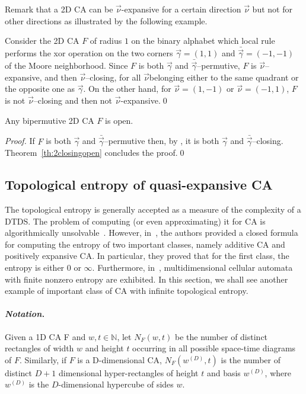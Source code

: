 \documentclass{llncs}
\newcommand{\n}{\ensuremath{\mathbb{N}}\xspace}
\newcommand{\zdu}{\ensuremath{\mathbb{Z}^2}\xspace}
\newcommand{\nn}{\vec\nu}
\newcommand{\gv}{\vec\gamma}
\renewcommand{\ll}{\vec \lambda}
\newcommand{\mm}{\vec \mu}
\newcommand{\ignore}[1]{}
\begin{document}
Remark that 
a 2D CA can be $\nn$-expansive for a certain direction $\nn$ but not
for other directions as illustrated by the following example.
\begin{example}\label{ex:1}
Consider the 2D CA $F$ of radius $1$ on the binary alphabet
which local rule performs the xor operation on the two corners
$\gv=(1,1)$ and $\bar{\gv}=(-1,-1)$ of the Moore neighborhood.
Since $F$ is both $\gv$ and $\bar{\gv}$--permutive, $F$ is
$\nn$--expansive, and then $\nn$--closing, for all $ \nn$belonging either to the same quadrant or the opposite one as $\gv$. 
On the other hand, for $\nn=(1,-1)$ or
$\nn=(-1,1)$, $F$ is not $\nn$--closing and then not
$\nn$-expansive.\qed
\end{example}
\begin{proposition}
Any bipermutive 2D CA $F$ is open.
\end{proposition}
\begin{proof}
If $F$ is both $\gv$ and $\bar{\gv}$--permutive then, 
by \cite[Prop. 5]{dennunzio08}, it is both $\gv$ and $\bar{\gv}$--closing.
Theorem~\ref{th:2closingopen} concludes the proof.\qed
\ignore{
Assume that $F$ is both $\gv$ and $\bar{\gv}$--permutive.
Let $\mm,\ll\in\zdu$ be such that $\gv\cdot\mm>0$ and
$\gv\cdot\ll>0$. By Proposition~\ref{prop:bipexp}, $F$ is both
$\ll$ and $\mm$--expansive, and then, by
Theorem~\ref{th:expclosing}, it is $\ll,\bar{\ll},\mm,\bar{\mm}$ closing.
Theorem~\ref{th:4closingopen} concludes the proof.
}
\end{proof}


\subsection{Topological entropy of quasi-expansive CA}
The topological entropy is generally accepted as a measure of the complexity of a DTDS. The problem of computing (or even approximating) it for CA is algorithmically 
unsolvable~\cite{hurd92}. However, in~\cite{damico03}, the authors
provided a closed formula for computing the entropy of two important classes, namely additive CA and positively expansive CA.
In particular, they proved that for the first class, the entropy is either 
$0$ or $\infty$. Furthermore, in~\cite{mey08}, multidimensional cellular automata with finite nonzero entropy are exhibited. In this section, we shall see
another example of important class of CA with infinite topological entropy.


\paragraph{\emph{Notation.}} Given a 1D CA F and
$w,t\in\n$, let $N_F(w,t)$ be the number of distinct rectangles of width $w$ and height $t$ occurring in all possible space-time diagrams  
of $F$. 
Similarly, if $F$ is a D-dimensional CA, $N_F(w^{(D)},t)$ is the
number of distinct $D+1$ dimensional hyper-rectangles of
height $t$ and basis $w^{(D)}$, where 
$w^{(D)}$ is the $D$-dimensional hypercube of sides $w$.
\end{document}
